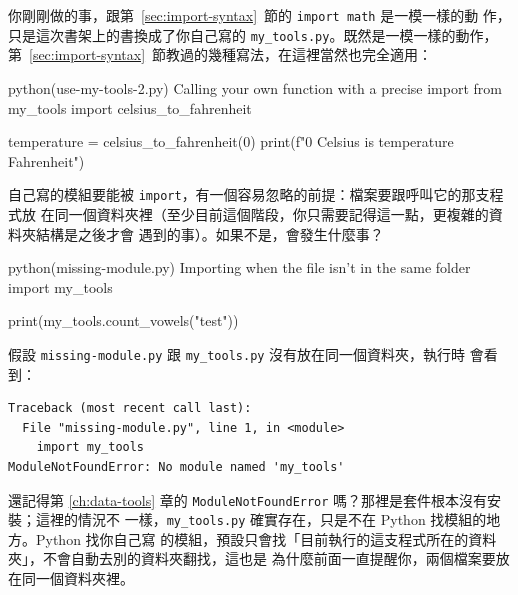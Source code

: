 
你剛剛做的事，跟第~\ref{sec:import-syntax}~節的 \texttt{import math} 是一模一樣的動
作，只是這次書架上的書換成了你自己寫的 \texttt{my\_tools.py}。既然是一模一樣的動作，
第~\ref{sec:import-syntax}~節教過的幾種寫法，在這裡當然也完全適用：

\begin{example}{python}{(use-my-tools-2.py) Calling your own function with a precise import}
from my_tools import celsius_to_fahrenheit

temperature = celsius_to_fahrenheit(0)
print(f"0 Celsius is {temperature} Fahrenheit")
\end{example}



自己寫的模組要能被 \texttt{import}，有一個容易忽略的前提：檔案要跟呼叫它的那支程式放
在同一個資料夾裡（至少目前這個階段，你只需要記得這一點，更複雜的資料夾結構是之後才會
遇到的事）。如果不是，會發生什麼事？

\begin{example}{python}{(missing-module.py) Importing when the file isn't in the same folder}
import my_tools

print(my_tools.count_vowels("test"))
\end{example}

假設 \texttt{missing-module.py} 跟 \texttt{my\_tools.py} 沒有放在同一個資料夾，執行時
會看到：

\begin{verbatim}
Traceback (most recent call last):
  File "missing-module.py", line 1, in <module>
    import my_tools
ModuleNotFoundError: No module named 'my_tools'
\end{verbatim}

還記得第 \ref{ch:data-tools} 章的 \texttt{ModuleNotFoundError} 嗎？那裡是套件根本沒有安裝；這裡的情況不
一樣，\texttt{my\_tools.py} 確實存在，只是不在 Python 找模組的地方。Python 找你自己寫
的模組，預設只會找「目前執行的這支程式所在的資料夾」，不會自動去別的資料夾翻找，這也是
為什麼前面一直提醒你，兩個檔案要放在同一個資料夾裡。

